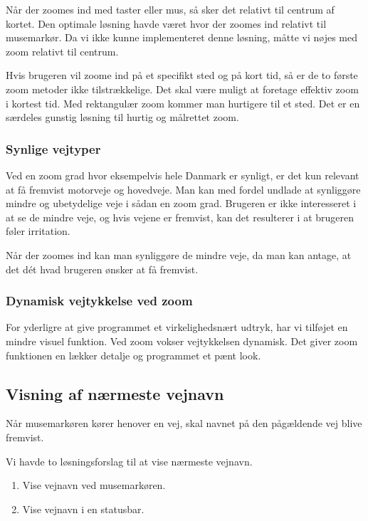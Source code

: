 Når der zoomes ind med taster eller mus, så sker det relativt til centrum af kortet. Den optimale løsning havde været hvor der zoomes ind relativt til musemarkør. Da vi ikke kunne implementeret denne løsning, måtte vi nøjes med zoom relativt til centrum.

Hvis brugeren vil zoome ind på et specifikt sted og på kort tid, så er de to første zoom metoder ikke tilstrækkelige. Det skal være muligt at foretage effektiv zoom i kortest tid. Med rektangulær zoom kommer man hurtigere til et sted. Det er en særdeles gunstig løsning til hurtig og målrettet zoom. 

\subsubsection{Synlige vejtyper}

Ved en zoom grad hvor eksempelvis hele Danmark er synligt, er det kun relevant at få fremvist motorveje og hovedveje. Man kan med fordel undlade at synliggøre mindre og ubetydelige veje i sådan en zoom grad. Brugeren er ikke interesseret i at se de mindre veje, og hvis vejene er fremvist, kan det resulterer i at brugeren føler irritation. 

Når der zoomes ind kan man synliggøre de mindre veje, da man kan antage, at det dét hvad brugeren ønsker at få fremvist.   

\subsubsection{Dynamisk vejtykkelse ved zoom}

For yderligre at give programmet et virkelighedsnært udtryk, har vi tilføjet en mindre visuel funktion. Ved zoom vokser vejtykkelsen dynamisk. Det giver zoom funktionen en lækker detalje og programmet et pænt look. 
  

\subsection{Visning af nærmeste vejnavn}

Når musemarkøren kører henover en vej, skal navnet på den pågældende vej blive fremvist.

Vi havde to løsningsforslag til at vise nærmeste vejnavn. 

\begin{enumerate}
   \item Vise vejnavn ved musemarkøren.
   \item Vise vejnavn i en statusbar.
\end{enumerate}

